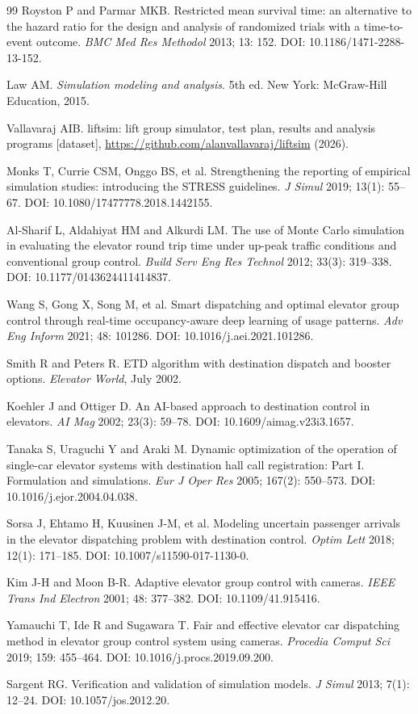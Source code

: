 \begin{thebibliography}{99}
Royston P and Parmar MKB. Restricted mean survival time: an alternative to the hazard ratio for the design and analysis of randomized trials with a time-to-event outcome. \emph{BMC Med Res Methodol} 2013; 13: 152. DOI: 10.1186/1471-2288-13-152.

Law AM. \emph{Simulation modeling and analysis}. 5th ed. New York: McGraw-Hill Education, 2015.

Vallavaraj AIB. liftsim: lift group simulator, test plan, results and analysis programs [dataset], \url{https://github.com/alanvallavaraj/liftsim} (2026).

Monks T, Currie CSM, Onggo BS, et al. Strengthening the reporting of empirical simulation studies: introducing the STRESS guidelines. \emph{J Simul} 2019; 13(1): 55--67. DOI: 10.1080/17477778.2018.1442155.

Al-Sharif L, Aldahiyat HM and Alkurdi LM. The use of Monte Carlo simulation in evaluating the elevator round trip time under up-peak traffic conditions and conventional group control. \emph{Build Serv Eng Res Technol} 2012; 33(3): 319--338. DOI: 10.1177/0143624411414837.

Wang S, Gong X, Song M, et al. Smart dispatching and optimal elevator group control through real-time occupancy-aware deep learning of usage patterns. \emph{Adv Eng Inform} 2021; 48: 101286. DOI: 10.1016/j.aei.2021.101286.

Smith R and Peters R. ETD algorithm with destination dispatch and booster options. \emph{Elevator World}, July 2002.

Koehler J and Ottiger D. An AI-based approach to destination control in elevators. \emph{AI Mag} 2002; 23(3): 59--78. DOI: 10.1609/aimag.v23i3.1657.

Tanaka S, Uraguchi Y and Araki M. Dynamic optimization of the operation of single-car elevator systems with destination hall call registration: Part I. Formulation and simulations. \emph{Eur J Oper Res} 2005; 167(2): 550--573. DOI: 10.1016/j.ejor.2004.04.038.

Sorsa J, Ehtamo H, Kuusinen J-M, et al. Modeling uncertain passenger arrivals in the elevator dispatching problem with destination control. \emph{Optim Lett} 2018; 12(1): 171--185. DOI: 10.1007/s11590-017-1130-0.

Kim J-H and Moon B-R. Adaptive elevator group control with cameras. \emph{IEEE Trans Ind Electron} 2001; 48: 377--382. DOI: 10.1109/41.915416.

Yamauchi T, Ide R and Sugawara T. Fair and effective elevator car dispatching method in elevator group control system using cameras. \emph{Procedia Comput Sci} 2019; 159: 455--464. DOI: 10.1016/j.procs.2019.09.200.

Sargent RG. Verification and validation of simulation models. \emph{J Simul} 2013; 7(1): 12--24. DOI: 10.1057/jos.2012.20.

\end{thebibliography}
